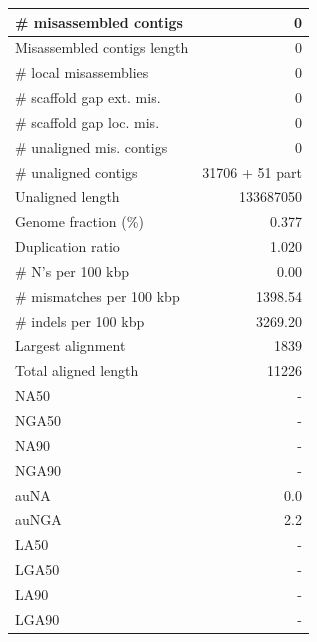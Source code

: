 \documentclass[12pt,a4paper]{article}
\begin{document}
\begin{table}[ht]
\begin{center}
\begin{tabular}{|l*{1}{|r}|}
\# misassembled contigs & 0 \\ \hline
Misassembled contigs length & 0 \\ \hline
\# local misassemblies & 0 \\ \hline
\# scaffold gap ext. mis. & 0 \\ \hline
\# scaffold gap loc. mis. & 0 \\ \hline
\# unaligned mis. contigs & 0 \\ \hline
\# unaligned contigs & 31706 + 51 part \\ \hline
Unaligned length & 133687050 \\ \hline
Genome fraction (\%) & 0.377 \\ \hline
Duplication ratio & 1.020 \\ \hline
\# N's per 100 kbp & 0.00 \\ \hline
\# mismatches per 100 kbp & 1398.54 \\ \hline
\# indels per 100 kbp & 3269.20 \\ \hline
Largest alignment & 1839 \\ \hline
Total aligned length & 11226 \\ \hline
NA50 & - \\ \hline
NGA50 & - \\ \hline
NA90 & - \\ \hline
NGA90 & - \\ \hline
auNA & 0.0 \\ \hline
auNGA & 2.2 \\ \hline
LA50 & - \\ \hline
LGA50 & - \\ \hline
LA90 & - \\ \hline
LGA90 & - \\ \hline
\end{tabular}
\end{center}
\end{table}
\end{document}
